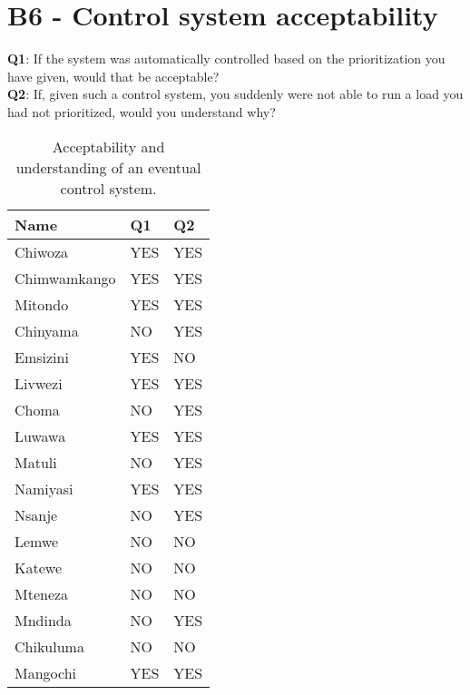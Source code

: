 \newpage
\section*{\large{B6 - Control system acceptability}}\label{seq:acceptability}
\vspace*{1cm}

\textbf{Q1}: If the system was automatically controlled based on the prioritization you have given, would that be acceptable?\\

\noindent\textbf{Q2}: If, given such a control system, you suddenly were not able to run a load you had not prioritized, would you understand why?\\

\begin{table}[ht!]
\centering
    \begin{tabular}{ m{4cm} m{2.5cm} m{2.5cm}} 
    \toprule
    \toprule
    \textbf{Name} & \textbf{Q1} & \textbf{Q2}\\
    \midrule
    Chiwoza         & YES & YES  \\
    Chimwamkango    & YES & YES  \\
    Mitondo         & YES & YES  \\
    Chinyama        & NO & YES  \\
    Emsizini        & YES & NO  \\
    Livwezi         & YES & YES  \\
    Choma           & NO & YES  \\
    Luwawa          & YES & YES  \\
    Matuli          & NO & YES  \\
    Namiyasi        & YES & YES  \\
    Nsanje          & NO & YES  \\
    Lemwe           & NO & NO  \\
    Katewe          & NO & NO  \\
    Mteneza         & NO & NO  \\
    Mndinda         & NO & YES  \\
    Chikuluma       & NO & NO  \\
    Mangochi        & YES & YES  \\
    
    \bottomrule
    \bottomrule
    \end{tabular}
\caption[User survey- control acceptability and understanding ]{Acceptability and understanding of an eventual control system.}
\label{fig:acceptability}
\end{table}

